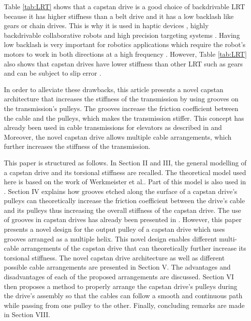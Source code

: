 \documentclass[twocolumn,10pt]{asme2ej}
\begin{document}
\par Table \ref{tab:LRT} shows that a capstan drive is a good choice of backdrivable LRT because it has higher stiffness than a belt drive and it has a low backlash like gears or chain drives. This is why it is used in haptic devices \cite{perret2014advantages}\cite{baser2013kinematic}, highly backdrivable collaborative robots \cite{townsend1988effect}\cite{rooks2006harmonious}\cite{phan2014guided} and high precision targeting systems \cite{lu2015development}\cite{lu2012non}\cite{lu2013transmission}\cite{xie2019analytical}. Having low backlash is very important for  robotics applications which require the robot's motors to work in both directions at a high frequency \cite{brooks1990telerobotic}\cite{gealy2019quasi}. However, Table \ref{tab:LRT} also shows that capstan drives have lower stiffness than other LRT such as gears and can be subject to slip error \cite{lu2013transmission}\cite{baser2010theoretical}.\par
In order to alleviate these drawbacks, this article presents a novel capstan architecture that increases the stiffness of the transmission by using grooves on the transmission's pulleys. The grooves increase the friction coefficient between the cable and the pulleys, which makes the transmission stiffer. This concept has already been used in cable transmissions for elevators as described in \cite{gibsonfred} and \cite{hymans2013neuzeitliche} Moreover, the novel capstan drive allows multiple cable arrangements, which further increases the stiffness of the transmission.\par This paper is structured as follows. In Section II and III, the general modelling of a capstan drive and its torsional stiffness are recalled. The theoretical model used here is based on the work of Werkmeister et al.\cite{werkmeister2007theoretical}. Part of this model is also used in \cite{baser2010theoretical}. Section IV explains how grooves etched along the surface of a capstan drive's pulleys can theoretically increase the friction coefficient between the drive's cable and its pulleys thus increasing the overall stiffness of the capstan drive. The use of grooves in capstan drives has already been presented in \cite{lu2012non}. However, this paper presents a novel design for the output pulley of a capstan drive which uses grooves arranged as a multiple helix. This novel design enables different multi-cable arrangements of the capstan drive that can theoretically further increase its torsional stiffness. The novel capstan drive architecture as well as different possible cable arrangements are presented in Section V. The advantages and disadvantages  of each of the proposed arrangements are discussed. Section VI then proposes a method to properly arrange the capstan drive's pulleys during the drive's assembly so that the cables can follow a smooth and continuous path while passing from one pulley to the other. Finally, concluding remarks are made in Section VIII.
\end{document}
